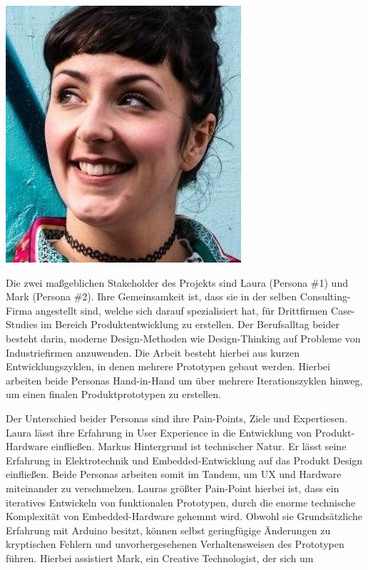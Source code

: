 \begin{tcolorbox}
    \includegraphics[width=\linewidth]{bilder/chapter3/laura.png}
\end{tcolorbox}
Die zwei maßgeblichen Stakeholder des Projekts sind Laura (Persona \#1) und Mark (Persona \#2). Ihre Gemeinsamkeit ist, dass sie in der selben Consulting-Firma angestellt sind, welche sich darauf spezialisiert hat, für Drittfirmen Case-Studies im Bereich Produktentwicklung zu erstellen. Der Berufsalltag beider besteht darin, moderne Design-Methoden wie Design-Thinking auf Probleme von Industriefirmen anzuwenden. Die Arbeit besteht hierbei aus kurzen Entwicklungszyklen, in denen mehrere Prototypen gebaut werden. Hierbei arbeiten beide Personas Hand-in-Hand um über mehrere Iterationszyklen hinweg, um einen finalen Produktprototypen zu erstellen.

Der Unterschied beider Personas sind ihre Pain-Points, Ziele und Expertiesen. Laura lässt ihre Erfahrung in User Experience in die Entwicklung von Produkt-Hardware einfließen. Markus Hintergrund ist technischer Natur. Er lässt seine Erfahrung in Elektrotechnik und Embedded-Entwicklung auf das Produkt Design einfließen. Beide Personas arbeiten somit im Tandem, um \ac{UX} und Hardware miteinander zu verschmelzen. Lauras größter Pain-Point hierbei ist, dass ein iteratives Entwickeln von funktionalen Prototypen, durch die enorme technische Komplexität von Embedded-Hardware gehemmt wird. Obwohl sie Grundsätzliche Erfahrung mit Arduino besitzt, können selbst geringfügige Änderungen zu kryptischen Fehlern und unvorhergesehenen Verhaltensweisen des Prototypen führen. Hierbei assistiert Mark, ein Creative Technologist, der sich um 

